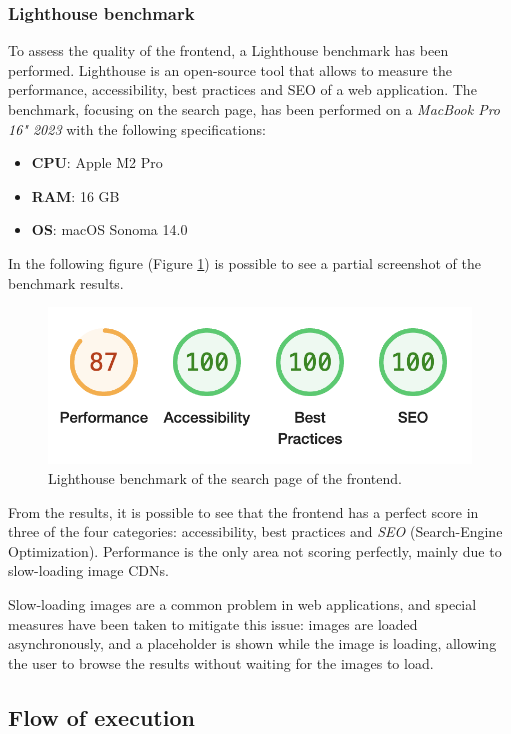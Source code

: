 \subsubsection{Lighthouse benchmark}
\label{sec:lighthouse-benchmark}

To assess the quality of the frontend, a Lighthouse benchmark has been performed. Lighthouse is an open-source tool that allows to measure the performance, accessibility, best practices and SEO of a web application. The benchmark, focusing on the search page, has been performed on a \textit{MacBook Pro 16" 2023} with the following specifications:

\begin{itemize}
  \item \textbf{CPU}: Apple M2 Pro
  \item \textbf{RAM}: 16 GB
  \item \textbf{OS}: macOS Sonoma 14.0
\end{itemize}

In the following figure (Figure \ref{fig:lighthouse-benchmark}) is possible to see a partial screenshot of the benchmark results.

\begin{figure}[H]
  \centering
  \includegraphics[width=.5\textwidth]{img/3_implementation/lighthouse-benchmark.png}
  \caption{Lighthouse benchmark of the search page of the frontend.}
  \label{fig:lighthouse-benchmark}
\end{figure}

From the results, it is possible to see that the frontend has a perfect score in three of the four categories: accessibility, best practices and \textit{SEO} (Search-Engine Optimization). Performance is the only area not scoring perfectly, mainly due to slow-loading image CDNs.

Slow-loading images are a common problem in web applications, and special measures have been taken to mitigate this issue: images are loaded asynchronously, and a placeholder is shown while the image is loading, allowing the user to browse the results without waiting for the images to load.

\newpage
\subsection{Flow of execution}

